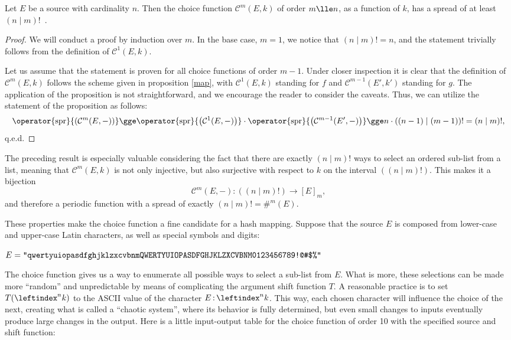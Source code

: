 \documentclass[12pt, a4paper]{article}
\newcommand{\C}{\mathcal{C}}
\newcommand{\spr}[1]{\operator{\mathrm{spr}}{\left(#1\right)}}
\newcommand{\lui}[1]{\leftindex^{#1}}
\newcommand{\elt}{\mathop{:}}
\begin{document}
\begin{proposition}
    Let $ E $ be a source with cardinality $ n $. Then the choice function $ \C^m(E, k) $ of order $ m \lle n $, as a function of $ k $, has a spread of at least $ (n \mid m)! $\ .
\end{proposition}
\begin{proof}
    We will conduct a proof by induction over $ m $. In the base case, $ m = 1 $, we notice that $ (n \mid m)! = n $, and the statement trivially follows from the definition of $ \C^1(E, k) $.

    Let us assume that the statement is proven for all choice functions of order $ m - 1 $. Under closer inspection it is clear that the definition of $ \C^m(E, k) $ follows the scheme given in proposition \ref{map}, with $ \C^1(E, k) $ standing for $ f $ and $ \C^{m-1}(E', k') $ standing for $ g $. The application of the proposition is not straightforward, and we encourage the reader to consider the caveats. Thus, we can utilize the statement of the proposition as follows:
    \[ \spr{\C^m(E, -)} \gge \spr{\C^1(E, -)} \cdot \spr{\C^{m-1}(E', -)} \gge n \cdot ((n-1) \mid (m-1))! = (n \mid m)!, \]
    q.e.d.
\end{proof}

The preceding result is especially valuable considering the fact that there are exactly $ (n \mid m)! $ ways to select an ordered sub-list from a list, meaning that $ \C^m(E, k) $ is not only injective, but also surjective with respect to $ k $ on the interval $ ((n \mid m)!) $. This makes it a bijection
\[ \C^m(E, -) \colon ((n \mid m)!) \to [E]_m, \]
and therefore a periodic function with a spread of exactly $ (n \mid m)! = \#^m(E) $.

These properties make the choice function a fine candidate for a hash mapping. Suppose that the source $ E $ is composed from lower-case and upper-case Latin characters, as well as special symbols and digits:

\begin{center}
    $ E = \mbox{\texttt{"qwertyuiopasdfghjklzxcvbnmQWERTYUIOPASDFGHJKLZXCVBNM0123456789!@\#\$\%"}} $
\end{center}

The choice function gives us a way to enumerate all possible ways to select a sub-list from $ E $. What is more, these selections can be made more ``random'' and unpredictable by means of complicating the argument shift function $ T $. A reasonable practice is to set $ T(\lui{n}k) $ to the ASCII value of the character $ E \elt \lui{n}k $. This way, each chosen character will influence the choice of the next, creating what is called a ``chaotic system'', where its behavior is fully determined, but even small changes to inputs eventually produce large changes in the output. Here is a little input-output table for the choice function of order 10 with the specified source and shift function:
\end{document}
